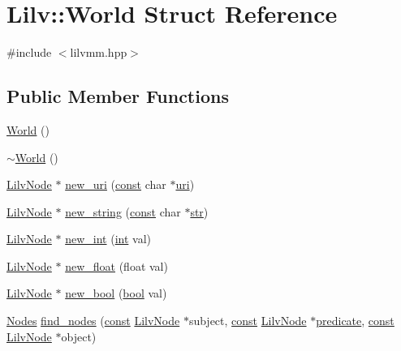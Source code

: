 \hypertarget{struct_lilv_1_1_world}{}\section{Lilv\+:\+:World Struct Reference}
\label{struct_lilv_1_1_world}


{\ttfamily \#include $<$lilvmm.\+hpp$>$}

\subsection*{Public Member Functions}
\begin{DoxyCompactItemize}
\item 
\hyperlink{struct_lilv_1_1_world_a0682d955e1bfdfa4890be2d17c60d5e0}{World} ()
\item 
\hyperlink{struct_lilv_1_1_world_a738e497502776a37af70a33d2f54d08c}{$\sim$\+World} ()
\item 
\hyperlink{lilv_8h_ae183dca3dca5368d34dbd863a405437b}{Lilv\+Node} $\ast$ \hyperlink{struct_lilv_1_1_world_a2ebec962d52c48c560a8f04763e0c59b}{new\+\_\+uri} (\hyperlink{getopt1_8c_a2c212835823e3c54a8ab6d95c652660e}{const} char $\ast$\hyperlink{lib_2expat_8h_a5a9fdd6c2606370ad12f24c078ac6585}{uri})
\item 
\hyperlink{lilv_8h_ae183dca3dca5368d34dbd863a405437b}{Lilv\+Node} $\ast$ \hyperlink{struct_lilv_1_1_world_a93eed29a0a3bd2671ad04e9fe1231cf4}{new\+\_\+string} (\hyperlink{getopt1_8c_a2c212835823e3c54a8ab6d95c652660e}{const} char $\ast$\hyperlink{sndfile__save_8m_a4b99ff73a8a869319570237b5c57ab03}{str})
\item 
\hyperlink{lilv_8h_ae183dca3dca5368d34dbd863a405437b}{Lilv\+Node} $\ast$ \hyperlink{struct_lilv_1_1_world_a80121d9b236b76ae793b51bb6bf8b9ff}{new\+\_\+int} (\hyperlink{xmltok_8h_a5a0d4a5641ce434f1d23533f2b2e6653}{int} val)
\item 
\hyperlink{lilv_8h_ae183dca3dca5368d34dbd863a405437b}{Lilv\+Node} $\ast$ \hyperlink{struct_lilv_1_1_world_ad9681031b5d4cd451be37c5db1e120db}{new\+\_\+float} (float val)
\item 
\hyperlink{lilv_8h_ae183dca3dca5368d34dbd863a405437b}{Lilv\+Node} $\ast$ \hyperlink{struct_lilv_1_1_world_ab4519e78a6caf1e93981a074ff1004e7}{new\+\_\+bool} (\hyperlink{mac_2config_2i386_2lib-src_2libsoxr_2soxr-config_8h_abb452686968e48b67397da5f97445f5b}{bool} val)
\item 
\hyperlink{struct_lilv_1_1_nodes}{Nodes} \hyperlink{struct_lilv_1_1_world_a0af1925f36e1e4058e10b777a4b28636}{find\+\_\+nodes} (\hyperlink{getopt1_8c_a2c212835823e3c54a8ab6d95c652660e}{const} \hyperlink{lilv_8h_ae183dca3dca5368d34dbd863a405437b}{Lilv\+Node} $\ast$subject, \hyperlink{getopt1_8c_a2c212835823e3c54a8ab6d95c652660e}{const} \hyperlink{lilv_8h_ae183dca3dca5368d34dbd863a405437b}{Lilv\+Node} $\ast$\hyperlink{xlmath_8c_a767c5fa064d0a1e1f8b447769f1a890b}{predicate}, \hyperlink{getopt1_8c_a2c212835823e3c54a8ab6d95c652660e}{const} \hyperlink{lilv_8h_ae183dca3dca5368d34dbd863a405437b}{Lilv\+Node} $\ast$object)

\end{DoxyCompactItemize}
